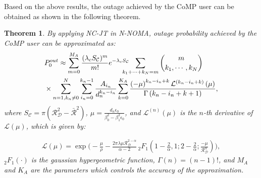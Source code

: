 \documentclass[10pt, doublecolumn]{IEEEtran}
\newtheorem{Theorem}{Theorem}
\newcommand{\Equ}[1]{
  \begin{align}
    #1
  \end{align}}
\begin{document}
Based on the above results, the outage achieved by the CoMP user can be obtained as
shown in the following theorem.
\begin{Theorem}
By applying NC-JT in N-NOMA, outage probability achieved by the CoMP user can be approximated as:
\begin{align}
	&P_{0}^{out} \approx \sum_{m=0}^{M_A}{\frac{(\lambda _cS_{\mathcal{C}})^m}{m!}}e^{-\lambda _cS_{\mathcal{C}}}\!\!\!\!\!\!\!\sum_{k_1+\cdots +k_N=m}{
	m \choose {k_1,\cdots ,k_N}}\\\notag
	&\times \sum_{n=1,k_n\ne 0}^N\sum_{i_n=0}^{k_n-1}{\frac{A_{i_n}}{d_{n}^{k_n-i_n}}\sum_{k=0}^{K_A}{\frac{\left( -\mu \right) ^{k_n-i_n+k}\mathcal{L} ^{\left( k_n-i_n+k \right)}\left( \mu \right)}{\Gamma \left( k_n-i_n+k+1 \right)}}} ,
\end{align}
where
${S_{\mathcal{C}}=\pi(\mathcal{R}_{\mathcal{D}}^2-\bar{\mathcal{R}}^2)}$,
${\mu =\frac{d_n\epsilon _0}{\beta _{0}^{2}-\beta _{1}^{2}\epsilon _0}}$,
and $\mathcal{L}^{(n)}(\mu)$ is the $n$-th derivative of $\mathcal{L}(\mu)$, which is given by:
\Equ{\mathcal{L} (\mu)\!=\exp \bigg(\!\!-\frac{\mu}{\rho} \!-\!\frac{2\pi \lambda \mu \mathcal{R} _{\mathcal{D}}^{2-\alpha}}{\alpha -2}\,_2F_1\left(\! 1\!-\!\frac{2}{\alpha},1;2\!-\!\frac{2}{\alpha};\!\frac{-\mu}{\mathcal{R} _{\mathcal{D}}^{\alpha}} \right)\!\bigg),}
$_2F_1(\cdot)$ is the gaussian hypergeometric function, $\Gamma(n)=(n-1)!$, and $M_A$ and $K_A$ are the parameters which controls the accuracy of the approximation.
\end{Theorem}
\end{document}
